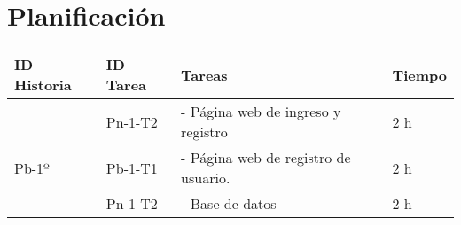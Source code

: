 \chapter{Planificación}

\begin{table}[htbp]
	\begin{center}
		\begin{tabular}{| p{2.0cm}|p{2.0cm} | p{5.5 cm} | p{3.0cm}|}
			\hline
			\centering\textbf{ID Historia} & \textbf{ID Tarea}& \textbf{Tareas} & \textbf{Tiempo}
			
			\\\hline
			
			 & \centering Pn-1-T2 & - Página web de ingreso y registro & 2 h
			\\
			\centering Pb-1º & \centering Pb-1-T1 & - Página web de registro de usuario. & 2 h
			\\
			& \centering Pn-1-T2 & - Base de datos & 2 h
			
			\\\hline
		\end{tabular}
	\end{center}
\end{table}